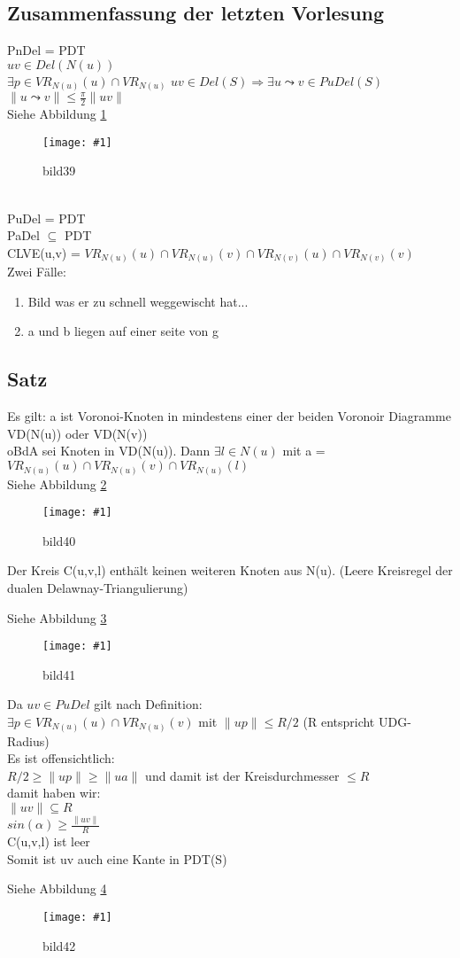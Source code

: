 \documentclass{article}
\newcommand{\bild}[4]{ %
	\begin{figure}[h!]
		\centering
		\texttt{[image: \#1]}
		\caption{#3}
		\label{#4}
	\end{figure}	
}
\newcommand{\sieheBild}[4]{
	Siehe Abbildung \ref{#4}
	\bild{#1}{#2}{#3}{#4}
}
\newcommand{\doubleAbs}[1]{
	\|#1\|
}
\begin{document}
\subsection*{Zusammenfassung der letzten Vorlesung}
PnDel = PDT\\
$uv \in Del(N(u))$\\
$\exists p \in VR_{N(u)}(u) \cap VR_{N(u)}$
$uv \in Del(S) \Rightarrow \exists u \leadsto v \in PuDel(S)$\\
$\doubleAbs{u \leadsto v} \leq \frac{\pi}{2}\doubleAbs{uv}$
\\
\sieheBild{Bilder/39.png}{0.4}{bild39}{Bild 39}
\\
PuDel = PDT\\
\grqq PaDel $\subseteq$ PDT \grqq\\
CLVE(u,v) = $VR_{N(u)}(u) \cap VR_{N(u)}(v) \cap VR_{N(v)}(u) \cap VR_{N(v)}(v)$\\
Zwei Fälle:\\
\begin{enumerate}
	\item Bild was er zu schnell weggewischt hat...
	\item a und b liegen auf einer seite von g
\end{enumerate}

\subsection*{Satz}
Es gilt: a ist Voronoi-Knoten in mindestens einer der beiden Voronoir Diagramme VD(N(u)) oder VD(N(v))\\
oBdA sei Knoten in VD(N(u)). Dann $\exists l \in N(u)$ mit a = $VR_{N(u)}(u) \cap VR_{N(u)}(v) \cap VR_{N(u)}(l)$\\
\sieheBild{Bilder/40.png}{0.4}{bild40}{Bild 40}
Der Kreis C(u,v,l) enthält keinen weiteren Knoten aus N(u). (Leere Kreisregel der dualen Delawnay-Triangulierung)
\sieheBild{Bilder/41.png}{0.4}{bild41}{Bild 41}
Da $uv \in PuDel$ gilt nach Definition:\\
$\exists p \in VR_{N(u)}(u) \cap VR_{N(u)}(v)$ mit $\doubleAbs{up} \leq R/2$ (R entspricht UDG-Radius)\\
Es ist offensichtlich: \\
$R/2 \geq \doubleAbs{up} \geq \doubleAbs{ua}$ und damit ist der Kreisdurchmesser $\leq R$\\
damit haben wir: \\
$\doubleAbs{uv} \subseteq R$\\
$sin(\alpha) \geq \frac{\doubleAbs{uv}}{R}$ \\
C(u,v,l) ist leer\\
Somit ist uv auch eine Kante in PDT(S)
\sieheBild{Bilder/42.png}{0.4}{bild42}{Bild 42}
\end{document}
